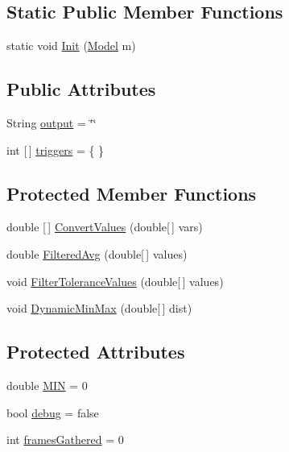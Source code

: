 \subsection*{Static Public Member Functions}
\begin{DoxyCompactItemize}
\item 
static void \hyperlink{class_real_sense_1_1_r_s_module_a4a96119975932690f75e86206e1fe63d}{Init} (\hyperlink{class_real_sense_1_1_model}{Model} m)
\end{DoxyCompactItemize}
\subsection*{Public Attributes}
\begin{DoxyCompactItemize}
\item 
String \hyperlink{class_real_sense_1_1_r_s_module_a5f0ea0ffd2361fd2b792ed808a67f911}{output} = \char`\"{}\char`\"{}
\item 
int \mbox{[}$\,$\mbox{]} \hyperlink{class_real_sense_1_1_r_s_module_a100988a1b957067db074dad8b4b9a078}{triggers} = \{ \}
\end{DoxyCompactItemize}
\subsection*{Protected Member Functions}
\begin{DoxyCompactItemize}
\item 
double \mbox{[}$\,$\mbox{]} \hyperlink{class_real_sense_1_1_r_s_module_a53505c9cb3af67e42a0710fdfad65ae5}{Convert\+Values} (double\mbox{[}$\,$\mbox{]} vars)
\item 
double \hyperlink{class_real_sense_1_1_r_s_module_a60d15c600059346aae1effda4a1f9a82}{Filtered\+Avg} (double\mbox{[}$\,$\mbox{]} values)
\item 
void \hyperlink{class_real_sense_1_1_r_s_module_a4294c740efc99c4f5c4034e812f1bdaa}{Filter\+Tolerance\+Values} (double\mbox{[}$\,$\mbox{]} values)
\item 
void \hyperlink{class_real_sense_1_1_r_s_module_a654263c518b548bad34f5e6ce9c6d2c5}{Dynamic\+Min\+Max} (double\mbox{[}$\,$\mbox{]} dist)
\end{DoxyCompactItemize}
\subsection*{Protected Attributes}
\begin{DoxyCompactItemize}
\item 
double \hyperlink{class_real_sense_1_1_r_s_module_aac57c31e50cebecbcb46a0526d7a6ac0}{M\+IN} = 0
\item 
bool \hyperlink{class_real_sense_1_1_r_s_module_a5f460d4bb4cb4b000426f9d316deae03}{debug} = false
\item 
int \hyperlink{class_real_sense_1_1_r_s_module_aa3ca8a7dcab6b7c9be3021c6d14702cf}{frames\+Gathered} = 0
\end{DoxyCompactItemize}
